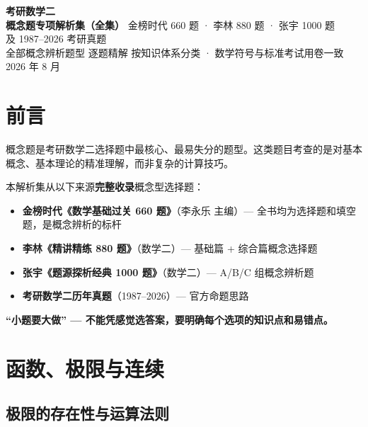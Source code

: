 \documentclass[12pt,a4paper]{ctexbook}
\begin{document}
\begin{titlepage}
\centering\vspace*{3cm}
{\Huge\bfseries\color{primary} 考研数学二 \\[0.3cm] 概念题专项解析集（全集）}
\vspace{1.2cm}
{\Large 金榜时代 660 题 · 李林 880 题 · 张宇 1000 题 \\[0.3cm] 及 1987--2026 考研真题 \\[0.2cm] 全部概念辨析题型 \quad 逐题精解}
\vspace{1cm}
{\normalsize 按知识体系分类 · 数学符号与标准考试用卷一致}
\vspace{1.5cm}
{\normalsize 2026 年 8 月}
\end{titlepage}

\tableofcontents

\chapter*{前言}

概念题是考研数学二选择题中最核心、最易失分的题型。这类题目考查的是对基本概念、基本理论的精准理解，而非复杂的计算技巧。

本解析集从以下来源\textbf{完整收录}概念型选择题：

\begin{itemize}[nosep]
  \item \textbf{金榜时代《数学基础过关 660 题》}（李永乐 主编）--- 全书均为选择题和填空题，是概念辨析的标杆
  \item \textbf{李林《精讲精练 880 题》}（数学二）--- 基础篇 + 综合篇概念选择题
  \item \textbf{张宇《题源探析经典 1000 题》}（数学二）--- A/B/C 组概念辨析题
  \item \textbf{考研数学二历年真题}（1987--2026）--- 官方命题思路
\end{itemize}

\begin{center}\color{warning}\textbf{``小题要大做'' --- 不能凭感觉选答案，要明确每个选项的知识点和易错点。}\end{center}

\newpage

\chapter{函数、极限与连续}

\section{极限的存在性与运算法则}
\end{document}

